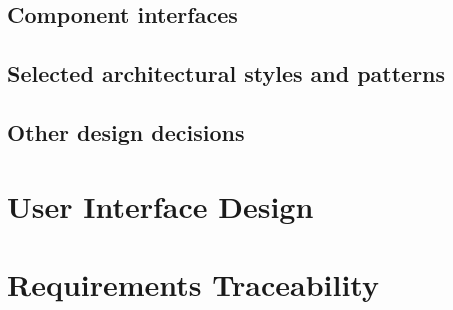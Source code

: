 \documentclass[titlepage]{article}
\begin{document}
\subsection{Component interfaces}
\subsection{Selected architectural styles and patterns}
\subsection{Other design decisions}
\pagebreak


\section{User Interface Design}
\pagebreak


\section{Requirements Traceability}
\end{document}
